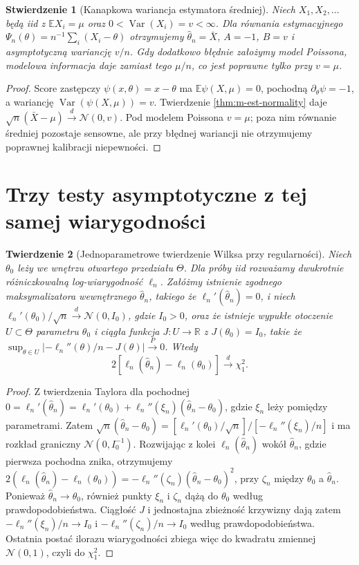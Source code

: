 \documentclass[11pt,a4paper,oneside]{report}
\numberwithin{equation}{chapter}
\theoremstyle{plain}
\newtheorem{twierdzenie}{Twierdzenie}[chapter]
\newtheorem{stwierdzenie}[twierdzenie]{Stwierdzenie}
\theoremstyle{definition}
\theoremstyle{remark}
\newcommand{\R}{\mathbb R}
\newcommand{\E}{\mathbb E}
\newcommand{\Var}{\operatorname{Var}}
\newcommand{\Normal}{\mathcal N}
\begin{document}
\begin{stwierdzenie}[Kanapkowa wariancja estymatora średniej]
Niech $X_1,X_2,\ldots$ będą iid z $\E X_i=\mu$ oraz
$0<\Var(X_i)=v<\infty$. Dla równania estymacyjnego
$\Psi_n(\theta)=n^{-1}\sum_i(X_i-\theta)$ otrzymujemy
$\widehat\theta_n=\bar X$, $A=-1$, $B=v$ i
asymptotyczną wariancję $v/n$. Gdy dodatkowo błędnie
założymy model Poissona, modelowa informacja daje zamiast
tego $\mu/n$, co jest poprawne tylko przy $v=\mu$.
\end{stwierdzenie}
\begin{proof}
Score zastępczy $\psi(x,\theta)=x-\theta$ ma
$\E\psi(X,\mu)=0$, pochodną $\partial_\theta\psi=-1$,
a wariancję $\Var(\psi(X,\mu))=v$. Twierdzenie
\ref{thm:m-est-normality} daje
$\sqrt n(\bar X-\mu)\xrightarrow{d}\Normal(0,v)$.
Pod modelem Poissona $v=\mu$; poza nim równanie średniej
pozostaje sensowne, ale przy błędnej wariancji nie otrzymujemy
poprawnej kalibracji niepewności.
\end{proof}

\section{Trzy testy asymptotyczne z tej samej wiarygodności}
\begin{twierdzenie}[Jednoparametrowe twierdzenie Wilksa przy regularności]
\label{thm:wilks-one}
Niech $\theta_0$ leży we wnętrzu otwartego przedziału
$\Theta$. Dla próby iid rozważamy dwukrotnie różniczkowalną
log-wiarygodność $\ell_n$. Załóżmy istnienie zgodnego
maksymalizatora wewnętrznego $\widehat\theta_n$, takiego że
$\ell_n'(\widehat\theta_n)=0$, i niech
$\ell_n'(\theta_0)/\sqrt n\xrightarrow{d}\Normal(0,I_0)$,
gdzie $I_0>0$, oraz że istnieje wypukłe otoczenie
$U\subset\Theta$ parametru $\theta_0$ i ciągła funkcja
$J:U\to\R$ z $J(\theta_0)=I_0$, takie że
$\sup_{\theta\in U}|-\ell_n''(\theta)/n-J(\theta)|
\xrightarrow{P}0$. Wtedy
\[
2[\ell_n(\widehat\theta_n)-\ell_n(\theta_0)]
\xrightarrow{d}\chi_1^2.
\]
\end{twierdzenie}
\begin{proof}
Z twierdzenia Taylora dla pochodnej
$0=\ell_n'(\widehat\theta_n)
=\ell_n'(\theta_0)+\ell_n''(\xi_n)(\widehat\theta_n-
\theta_0)$, gdzie $\xi_n$ leży pomiędzy parametrami.
Zatem $\sqrt n(\widehat\theta_n-\theta_0)
=[\ell_n'(\theta_0)/\sqrt n]/[-\ell_n''(\xi_n)/n]$
i ma rozkład graniczny $\Normal(0,I_0^{-1})$.
Rozwijając z kolei $\ell_n(\widehat\theta_n)$ wokół
$\widehat\theta_n$, gdzie pierwsza pochodna znika, otrzymujemy
$2(\ell_n(\widehat\theta_n)-\ell_n(\theta_0))
= -\ell_n''(\zeta_n)(\widehat\theta_n-\theta_0)^2$,
przy $\zeta_n$ między $\theta_0$ a $\widehat\theta_n$.
Ponieważ $\widehat\theta_n\to\theta_0$, również punkty
$\xi_n$ i $\zeta_n$ dążą do $\theta_0$ według
prawdopodobieństwa. Ciągłość $J$ i jednostajna zbieżność
krzywizny dają zatem
$-\ell_n''(\xi_n)/n\to I_0$ i
$-\ell_n''(\zeta_n)/n\to I_0$ według
prawdopodobieństwa. Ostatnia postać ilorazu wiarygodności
zbiega więc do kwadratu zmiennej $\Normal(0,1)$,
czyli do $\chi_1^2$.
\end{proof}
\end{document}
